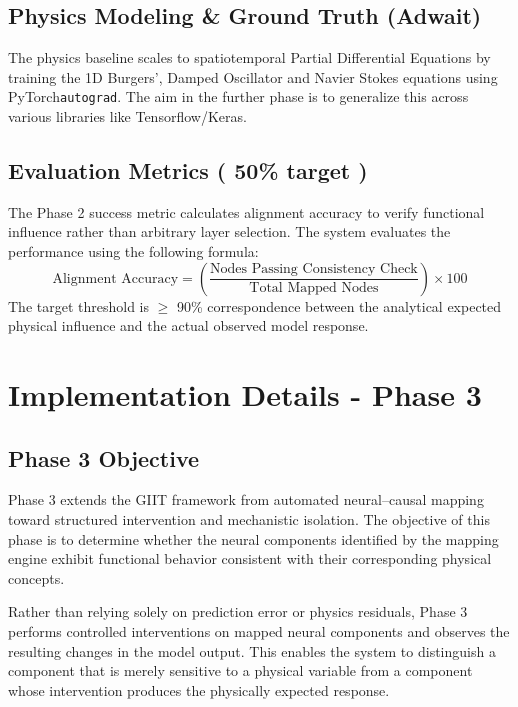 \documentclass[12pt,singleside,a4paper]{article}
\begin{document}
\subsection{Physics Modeling \& Ground Truth (Adwait)}
The physics baseline scales to spatiotemporal Partial Differential Equations by training the 1D Burgers', Damped Oscillator and Navier Stokes equations using PyTorch\texttt{autograd}. The aim in the further phase is to generalize this across various libraries like Tensorflow/Keras.

\subsection{Evaluation Metrics ( 50\% target )}
The Phase 2 success metric calculates alignment accuracy to verify functional influence rather than arbitrary layer selection. The system evaluates the performance using the following formula:
\begin{equation}
\text{Alignment Accuracy} = \left( \frac{\text{Nodes Passing Consistency Check}}{\text{Total Mapped Nodes}} \right) \times 100
\end{equation}
The target threshold is $\ge$ 90\% correspondence between the analytical expected physical influence and the actual observed model response.


\section{Implementation Details - Phase 3}

\subsection{Phase 3 Objective}

Phase 3 extends the GIIT framework from automated neural--causal
mapping toward structured intervention and mechanistic isolation. The
objective of this phase is to determine whether the neural components
identified by the mapping engine exhibit functional behavior consistent
with their corresponding physical concepts.

Rather than relying solely on prediction error or physics residuals,
Phase 3 performs controlled interventions on mapped neural components
and observes the resulting changes in the model output. This enables
the system to distinguish a component that is merely sensitive to a
physical variable from a component whose intervention produces the
physically expected response.
\end{document}
